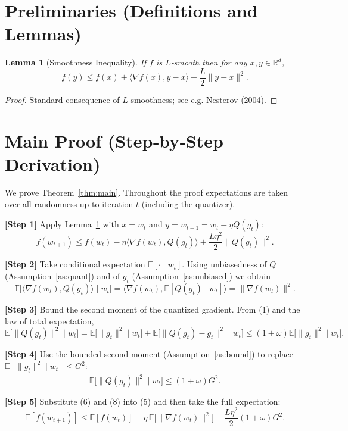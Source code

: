 \documentclass{article}
\newtheorem{lemma}{Lemma}
\newcommand{\EE}{\mathbb{E}}
\newcommand{\RR}{\mathbb{R}}
\begin{document}
\section*{Preliminaries (Definitions and Lemmas)}
\begin{lemma}[Smoothness Inequality]\label{lem:smooth}
If $f$ is $L$‑smooth then for any $x,y\in\RR^{d}$,
\[
f(y)\le f(x)+\langle\nabla f(x),y-x\rangle+\frac{L}{2}\|y-x\|^{2}.
\tag{4}
\]
\end{lemma}
\begin{proof}
Standard consequence of $L$‑smoothness; see e.g. Nesterov (2004). \qedhere
\end{proof}

\section*{Main Proof (Step‑by‑Step Derivation)}
We prove Theorem~\ref{thm:main}. Throughout the proof expectations are taken over all randomness up to iteration $t$ (including the quantizer).

\noindent\textbf{[Step 1]} Apply Lemma~\ref{lem:smooth} with $x=w_{t}$ and $y=w_{t+1}=w_{t}-\eta Q(g_{t})$:
\[
f(w_{t+1})\le f(w_{t})-\eta\langle\nabla f(w_{t}),Q(g_{t})\rangle+\frac{L\eta^{2}}{2}\|Q(g_{t})\|^{2}.
\tag{5}
\]

\noindent\textbf{[Step 2]} Take conditional expectation $\EE[\cdot\mid w_{t}]$.
Using unbiasedness of $Q$ (Assumption~\ref{as:quant}) and of $g_{t}$ (Assumption~\ref{as:unbiased}) we obtain
\[
\EE\!\big[\langle\nabla f(w_{t}),Q(g_{t})\rangle\mid w_{t}\big]
= \langle\nabla f(w_{t}),\EE[Q(g_{t})\mid w_{t}]\rangle
= \|\nabla f(w_{t})\|^{2}.
\tag{6}
\]

\noindent\textbf{[Step 3]} Bound the second moment of the quantized gradient.
From (1) and the law of total expectation,
\[
\EE\!\big[\|Q(g_{t})\|^{2}\mid w_{t}\big]
= \EE\!\big[\|g_{t}\|^{2}\mid w_{t}\big] + \EE\!\big[\|Q(g_{t})-g_{t}\|^{2}\mid w_{t}\big]
\le (1+\omega)\EE\!\big[\|g_{t}\|^{2}\mid w_{t}\big].
\tag{7}
\]

\noindent\textbf{[Step 4]} Use the bounded second moment (Assumption~\ref{as:bound}) to replace $\EE[\|g_{t}\|^{2}\mid w_{t}]\le G^{2}$:
\[
\EE\!\big[\|Q(g_{t})\|^{2}\mid w_{t}\big]\le (1+\omega)G^{2}.
\tag{8}
\]

\noindent\textbf{[Step 5]} Substitute (6) and (8) into (5) and then take the full expectation:
\[
\EE[f(w_{t+1})]\le \EE[f(w_{t})]-\eta\,\EE\!\big[\|\nabla f(w_{t})\|^{2}\big]
+\frac{L\eta^{2}}{2}(1+\omega)G^{2}.
\tag{9}
\]
\end{document}
